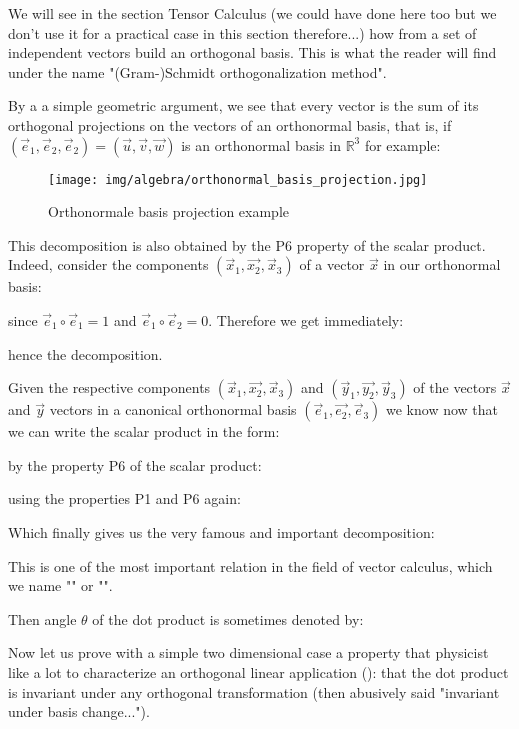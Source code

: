 	\begin{tcolorbox}[title=Remark,colframe=black,arc=10pt]
	We will see in the section Tensor Calculus (we could have done here too but we don't use it for a practical case in this section therefore...) how from a set of independent vectors build an orthogonal basis. This is what the reader will find under the name  "(Gram-)Schmidt orthogonalization method".
	\end{tcolorbox}	
	By a a simple geometric argument, we see that every vector is the sum of its orthogonal projections on the vectors of an orthonormal basis, that is, if $(\vec{e}_1,\vec{e}_2,\vec{e}_2)=(\vec{u},\vec{v},\vec{w})$ is an orthonormal basis in $\mathbb{R}^3$ for example:
	
	\begin{figure}[H]
		\centering
		\texttt{[image: img/algebra/orthonormal\_basis\_projection.jpg]}
		\caption{Orthonormale basis projection example}
	\end{figure}
	This decomposition is also obtained by the P6 property of the scalar product. Indeed, consider the components $(\vec{x}_1,\vec{x_2},\vec{x}_3)$ of a vector $\vec{x}$ in our orthonormal basis:
	
	since $\vec{e}_1\circ\vec{e}_1=1$ and $\vec{e}_1\circ\vec{e}_2=0$. Therefore we get immediately:
	
	hence the decomposition.
	
	Given the respective components $(\vec{x}_1,\vec{x_2},\vec{x}_3)$ and $(\vec{y}_1,\vec{y_2},\vec{y}_3)$ of the vectors  $\vec{x}$ and $\vec{y}$ vectors in a canonical orthonormal basis $(\vec{e}_1,\vec{e_2},\vec{e}_3)$ we know now that we can write the scalar product in the form:
	
	by the property P6 of the scalar product:
	
	using the properties P1 and P6 again:
	
	Which finally gives us the very famous and important decomposition:
	
	This is one of the most important relation in the field of vector calculus, which we name "" or "".
	
	\begin{tcolorbox}[title=Remark,colframe=black,arc=10pt]
	Then angle $\theta$ of the dot product is sometimes denoted by:
	
	\end{tcolorbox}
	Now let us prove with a simple two dimensional case a property that physicist like a lot to characterize an orthogonal linear application (): that the dot product is invariant under any orthogonal transformation (then abusively said "invariant under basis change...").

